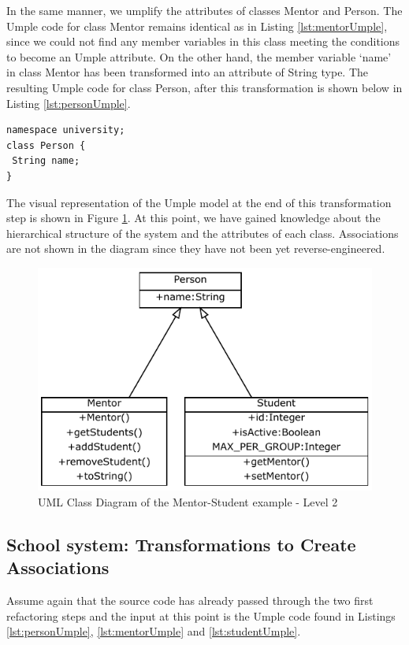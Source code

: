 In the same manner, we umplify the attributes of classes Mentor and Person.
The Umple code for class Mentor remains identical as in Listing \ref{lst:mentorUmple}, since we could not find any member variables in this class meeting the conditions to become an Umple attribute. On the other hand, the member variable `name' in class Mentor has been transformed into an attribute of String type. The resulting Umple code for class Person, after this transformation is shown below in Listing \ref{lst:personUmple}.

\begin{lstlisting}[style=UmpleOut,caption=Person.ump,label=lst:personUmple]
namespace university;
class Person {
 String name;
}
\end{lstlisting}

The visual representation of the Umple model at the end of this transformation step is shown in Figure \ref{fig:Example1a2}. At this point, we have gained knowledge about the hierarchical structure of the system and the attributes of each class. Associations are not shown in the diagram since they have not been yet reverse-engineered.

\begin{figure}[h]
\centering
\includegraphics{Figures/Example1a2.pdf} 
\caption{UML Class Diagram of the Mentor-Student example - Level 2}
\label{fig:Example1a2}
\end{figure}

\subsection{School system: Transformations to Create Associations}

Assume again that the source code has already passed through the two first refactoring steps and the input at this point is the Umple code found in Listings \ref{lst:personUmple}, \ref{lst:mentorUmple} and \ref{lst:studentUmple}.

